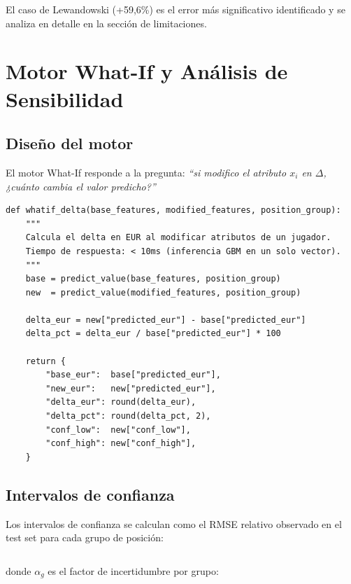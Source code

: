 \documentclass[12pt,a4paper]{report}
\begin{document}
El caso de Lewandowski (+59{,}6\%) es el error más significativo identificado y se analiza en detalle en la sección de limitaciones.


\chapter{Motor What-If y Análisis de Sensibilidad}

\section{Diseño del motor}

El motor What-If responde a la pregunta: \textit{``si modifico el atributo $x_i$ en $\Delta$, ¿cuánto cambia el valor predicho?''}

\begin{lstlisting}[caption={Función central del motor What-If}]
def whatif_delta(base_features, modified_features, position_group):
    """
    Calcula el delta en EUR al modificar atributos de un jugador.
    Tiempo de respuesta: < 10ms (inferencia GBM en un solo vector).
    """
    base = predict_value(base_features, position_group)
    new  = predict_value(modified_features, position_group)

    delta_eur = new["predicted_eur"] - base["predicted_eur"]
    delta_pct = delta_eur / base["predicted_eur"] * 100

    return {
        "base_eur":  base["predicted_eur"],
        "new_eur":   new["predicted_eur"],
        "delta_eur": round(delta_eur),
        "delta_pct": round(delta_pct, 2),
        "conf_low":  new["conf_low"],
        "conf_high": new["conf_high"],
    }
\end{lstlisting}

\section{Intervalos de confianza}

Los intervalos de confianza se calculan como el RMSE relativo observado en el test set para cada grupo de posición:

\begin{equation}
  [\hat{v} \cdot (1 - \alpha_g),\; \hat{v} \cdot (1 + \alpha_g)]
\end{equation}

donde $\alpha_g$ es el factor de incertidumbre por grupo:
\end{document}
